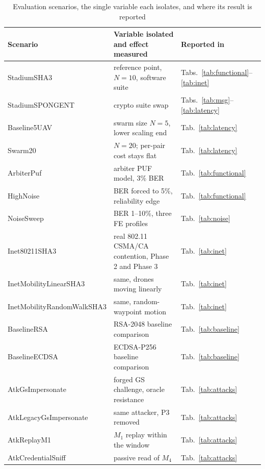\documentclass[journal]{IEEEtran}
\begin{document}
\begin{table}[H]
\centering
\caption{Evaluation scenarios, the single variable each isolates, and where
its result is reported}
\label{tab:scenarios}
\scriptsize
\setlength{\tabcolsep}{1.2pt}
\begin{tabular}{@{}>{\ttfamily\tiny}p{2.5cm}p{3.9cm}p{2.2cm}@{}}
\toprule
\normalfont\textbf{Scenario} & \textbf{Variable isolated and effect measured} &
\textbf{Reported in} \\
\midrule
StadiumSHA3 & reference point, $N{=}10$, software suite & Tabs.\ \ref{tab:functional}--\ref{tab:inet} \\
StadiumSPONGENT & crypto suite swap & Tabs.\ \ref{tab:msg}--\ref{tab:latency} \\
Baseline5UAV & swarm size $N{=}5$, lower scaling end & Tab.\ \ref{tab:latency} \\
Swarm20 & $N{=}20$; per-pair cost stays flat & Tab.\ \ref{tab:latency} \\
ArbiterPuf & arbiter PUF model, 3\% BER & Tab.\ \ref{tab:functional} \\
HighNoise & BER forced to 5\%, reliability edge & Tab.\ \ref{tab:functional} \\
NoiseSweep & BER 1--10\%, three FE profiles & Tab.\ \ref{tab:noise} \\
Inet80211SHA3 & real 802.11 CSMA/CA contention, Phase 2 and Phase 3 & Tab.\ \ref{tab:inet} \\
InetMobilityLinearSHA3 & same, drones moving linearly & Tab.\ \ref{tab:inet} \\
InetMobilityRandomWalkSHA3 & same, random-waypoint motion & Tab.\ \ref{tab:inet} \\
BaselineRSA & RSA-2048 baseline comparison & Tab.\ \ref{tab:baseline} \\
BaselineECDSA & ECDSA-P256 baseline comparison & Tab.\ \ref{tab:baseline} \\
AtkGsImpersonate & forged GS challenge, oracle resistance & Tab.\ \ref{tab:attacks} \\
AtkLegacyGsImpersonate & same attacker, P3 removed & Tab.\ \ref{tab:attacks} \\
AtkReplayM1 & $M_1$ replay within the window & Tab.\ \ref{tab:attacks} \\
AtkCredentialSniff & passive read of $M_4$ & Tab.\ \ref{tab:attacks} \\
\bottomrule
\end{tabular}
\end{table}

\end{document}

